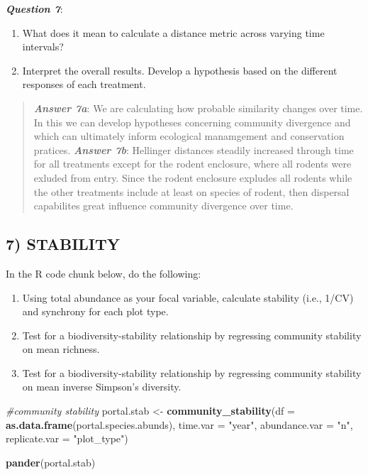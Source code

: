 \documentclass[]{article}
\newenvironment{Shaded}{\begin{snugshade}}{\end{snugshade}}
\newcommand{\KeywordTok}[1]{\textcolor[rgb]{0.13,0.29,0.53}{\textbf{{#1}}}}
\newcommand{\DataTypeTok}[1]{\textcolor[rgb]{0.13,0.29,0.53}{{#1}}}
\newcommand{\StringTok}[1]{\textcolor[rgb]{0.31,0.60,0.02}{{#1}}}
\newcommand{\CommentTok}[1]{\textcolor[rgb]{0.56,0.35,0.01}{\textit{{#1}}}}
\newcommand{\NormalTok}[1]{{#1}}
\providecommand{\tightlist}{%
  \setlength{\itemsep}{0pt}\setlength{\parskip}{0pt}}
\begin{document}
\textbf{\emph{Question 7}}:

\begin{enumerate}
\def\labelenumi{\alph{enumi}.}
\tightlist
\item
  What does it mean to calculate a distance metric across varying time
  intervals?
\item
  Interpret the overall results. Develop a hypothesis based on the
  different responses of each treatment.
\end{enumerate}

\begin{quote}
\textbf{\emph{Answer 7a}}: We are calculating how probable similarity
changes over time. In this we can develop hypotheses concerning
community divergence and which can ultimately inform ecological
manamgement and conservation pratices. \textbf{\emph{Answer 7b}}:
Hellinger distances steadily increased through time for all treatments
except for the rodent enclosure, where all rodents were exluded from
entry. Since the rodent enclosure expludes all rodents while the other
treatments include at least on species of rodent, then dispersal
capabilites great influence community divergence over time.
\end{quote}

\subsection{7) STABILITY}\label{stability}

In the R code chunk below, do the following:

\begin{enumerate}
\def\labelenumi{\arabic{enumi}.}
\tightlist
\item
  Using total abundance as your focal variable, calculate stability
  (i.e., 1/CV) and synchrony for each plot type.
\item
  Test for a biodiversity-stability relationship by regressing community
  stability on mean richness.
\item
  Test for a biodiversity-stability relationship by regressing community
  stability on mean inverse Simpson's diversity.
\end{enumerate}

\begin{Shaded}
\begin{Highlighting}[]
\CommentTok{#community stability}
\NormalTok{portal.stab <-}\StringTok{ }\KeywordTok{community_stability}\NormalTok{(}\DataTypeTok{df =} \KeywordTok{as.data.frame}\NormalTok{(portal.species.abunds),}
                                   \DataTypeTok{time.var =} \StringTok{"year"}\NormalTok{,}
                                   \DataTypeTok{abundance.var =} \StringTok{"n"}\NormalTok{,}
                                   \DataTypeTok{replicate.var =} \StringTok{"plot_type"}\NormalTok{)}

\KeywordTok{pander}\NormalTok{(portal.stab)}
\end{Highlighting}
\end{Shaded}
\end{document}
